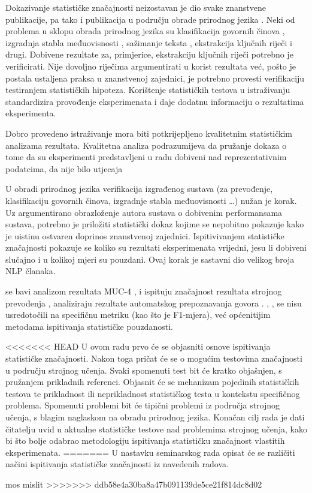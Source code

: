 Dokazivanje statističke značajnosti neizostavan je dio svake znanstvene publikacije, pa tako i publikacija u području obrade prirodnog jezika . Neki od problema u sklopu obrada prirodnog jezika su klasifikacija govornih činova  \citep{pratt1977toward}, izgradnja stabla međuovisnosti  \citep{collins2003head}, sažimanje teksta , ekstrakcija ključnih riječi  i drugi. Dobivene rezultate za, primjerice, ekstrakciju ključnih riječi potrebno je verificirati. Nije dovoljno riječima argumentirati u korist rezultata već, pošto je postala ustaljena praksa u znanstvenoj zajednici, je potrebno provesti verifikaciju testiranjem statističkih hipoteza. Korištenje statističkih testova u istraživanju standardizira provođenje eksperimenata i daje dodatnu informaciju o rezultatima eksperimenta.

Dobro provedeno istraživanje mora biti potkrijepljeno kvalitetnim statističkim analizama rezultata. Kvalitetna analiza podrazumijeva da pružanje dokaza o tome da su eksperimenti predstavljeni u radu dobiveni nad reprezentativnim podatcima, da nije bilo utjecaja 

U obradi prirodnog jezika  verifikacija izgrađenog sustava (za prevođenje, klasifikaciju govornih činova, izgradnje stabla međuovisnosti \dots) nužan je korak. Uz argumentirano obrazloženje autora sustava o dobivenim performansama sustava, potrebno je priložiti statistički dokaz kojime se nepobitno pokazuje kako je uistinu ostvaren doprinos znanstvenoj zajednici. Ispitivivanjem statističke značajnosti pokazuje se koliko su rezultati eksperimenata vrijedni, jesu li dobiveni slučajno i u kolikoj mjeri su pouzdani. Ovaj korak je sastavni dio velikog broja NLP članaka.

\citep{chinchor1992statistical} se bavi analizom rezultata MUC-4 , \citep{koehn2004statistical} i \citep{zhang2004interpreting} ispituju značajnost rezultata strojnog prevođenja , \citep{bisani2004bootstrap} analiziraju rezultate automatskog prepoznavanja govora . \citep{berg2012empirical}, \citep{yeh2000more} , \citep{thompson1993use} se nisu usredotočili na specifičnu metriku (kao što je F1-mjera), već općenitijim metodama ispitivanja statističke pouzdanosti.

<<<<<<< HEAD
U ovom radu prvo će se objasniti osnove ispitivanja statističke značajnosti. Nakon toga pričat će se o mogućim testovima značajnosti u području strojnog učenja. Svaki spomenuti test bit će kratko objašnjen, s pružanjem prikladnih referenci. Objasnit će se mehanizam pojedinih statističkih testova te prikladnost ili neprikladnost statističkog testa u kontekstu specifičnog problema. Spomenuti problemi bit će tipični problemi iz područja strojnog učenja, s blagim naglaskom na obradu prirodnog jezika. Konačan cilj rada je dati čitatelju uvid u aktualne statističke testove nad problemima strojnog učenja, kako bi što bolje odabrao metodologiju ispitivanja statističku značajnost vlastitih eksperimenata.
=======
U nastavku seminarskog rada opisat će se različiti načini ispitivanja statističke značajnosti iz navedenih radova.  

mos mislit
>>>>>>> ddb58e4a30ba8a47b091139de5ce21f814dc8d02
